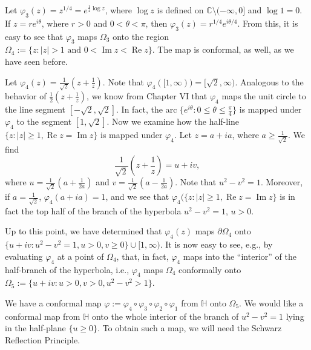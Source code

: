 \documentclass[11pt]{book}
\theoremstyle{definition}
\renewcommand{\Re}{\operatorname{Re}}
\renewcommand{\Im}{\operatorname{Im}}
\begin{document}
\begin{enumerate}
    Let $\varphi_3(z) = z^{1/4} = e^{\tfrac 1 4 \log z}$, where $\log z$ is defined on $\mathbb C \setminus (-\infty, 0]$ and $\log 1 = 0$.  If $z = re^{i\theta}$, where $r> 0$ and $0 < \theta < \pi$, then $\varphi_3(z) = r^{1/4} e^{i\theta/4}$.  From this, it is easy to see that $\varphi_3$ maps $\Omega_3$  onto the region $\Omega_4 := \{ z : |z| > 1 \text{ and } 0 < \Im z < \Re z \}$.  The map is conformal, as well, as we have seen before. 

    Let $\varphi_4(z) = \tfrac{1}{\sqrt 2} ( z + \tfrac 1 z)$.  %
    Note that $\varphi_4( [1,\infty) ) = [\sqrt 2, \infty)$.  Analogous to the behavior of $\tfrac 1 2 (z + \tfrac 1 z)$, we know from Chapter VI that $\varphi_4$ maps the unit circle to the line segment $[-\sqrt 2,\sqrt 2]$.  In fact, the arc $\{ e^{i\theta} : 0\leq \theta \leq \tfrac \pi 4 \}$ is mapped under $\varphi_4$ to the segment $[1, \sqrt 2]$.  Now we examine how the half-line $\{ z : |z| \geq 1, \Re z = \Im z \}$ is mapped under $\varphi_4$.  Let $z = a + ia$, where $a \geq \tfrac{1}{\sqrt 2}$.  We find 
    \[ \frac{1}{\sqrt 2} ( z + \frac 1 z ) =  u  + iv , \] where $u =\tfrac{1}{\sqrt 2}( a + \tfrac{1}{2a})$ and $v =\tfrac{1}{\sqrt 2} ( a - \tfrac{1}{2a})$.  Note that $u^2 - v^2 = 1$.  Moreover, if $a = \tfrac{1}{\sqrt 2}$, $\varphi_4(a + ia) = 1$, and we see that $\varphi_4( \{ z : |z| \geq 1, \Re z = \Im z \}$ is in fact the top half of the branch of the hyperbola $u^2 -v^2  = 1$, $u>0$.  

    Up to this point, we have determined that $\varphi_4(z)$ maps $\partial \Omega_4$ onto $ \{ u + iv : u^2 - v^2 = 1, u > 0, v \geq 0\} \cup [1, \infty)$.  It is now easy to see, e.g., by evaluating $\varphi_4$ at a point of $\Omega_4$, that, in fact, $\varphi_4$ maps into the ``interior'' of the half-branch of the hyperbola, i.e., $\varphi_4$ maps $\Omega_4$ conformally onto $\Omega_5 := \{ u  + iv : u > 0, v> 0, u^2 - v^2 > 1 \}$.  


      We have a conformal map $\varphi := \varphi_4 \circ \varphi_3 \circ \varphi_2 \circ \varphi_1$ from $\mathbb H$ onto $\Omega_5$.  We would like a conformal map from $\mathbb H$ onto the whole interior of the branch of $u^2 - v^2 = 1$ lying in the half-plane $\{ u \geq 0 \}$.  To obtain such a map, we will need the Schwarz Reflection Principle.


\end{enumerate}
\end{document}
